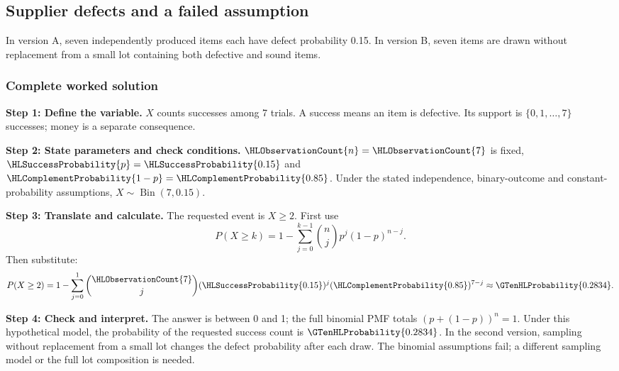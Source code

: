 \clearpage
\subsection{Supplier defects and a failed assumption}\label{prob:defects}
In version A, seven independently produced items each have defect probability 0.15. In version B, seven items are drawn without replacement from a small lot containing both defective and sound items.


\subsubsection*{Complete worked solution}\label{sol:defects}
\par\noindent\begin{minipage}{\linewidth}
\textbf{Step 1: Define the variable.} $X$ counts successes among 7 trials. A success means an item is defective. Its support is $\{0,1,\ldots,7\}$ successes; money is a separate consequence.
\end{minipage}\par\medskip
\par\noindent\begin{minipage}{\linewidth}
\textbf{Step 2: State parameters and check conditions.} $\HLObservationCount{n}=\HLObservationCount{7}$ is fixed, $\HLSuccessProbability{p}=\HLSuccessProbability{0.15}$ and $\HLComplementProbability{1-p}=\HLComplementProbability{0.85}$. Under the stated independence, binary-outcome and constant-probability assumptions, $X\sim\operatorname{Bin}(7,0.15)$.
\end{minipage}\par\medskip
\par\noindent\begin{minipage}{\linewidth}
\textbf{Step 3: Translate and calculate.} The requested event is $ X\geq2$. First use
\[P(X\geq k)=1-\sum_{j=0}^{k-1}\binom nj p^j(1-p)^{n-j}.\]
Then substitute:
\[P(X\geq2)=1-\sum_{j=0}^{1}\binom{\HLObservationCount{7}}j(\HLSuccessProbability{0.15})^j(\HLComplementProbability{0.85})^{7-j}\approx \GTenHLProbability{0.2834}.\]
\end{minipage}\par\medskip
\par\noindent\begin{minipage}{\linewidth}
\textbf{Step 4: Check and interpret.} The answer is between 0 and 1; the full binomial PMF totals $(p+(1-p))^n=1$. Under this hypothetical model, the probability of the requested success count is $\GTenHLProbability{0.2834}$. In the second version, sampling without replacement from a small lot changes the defect probability after each draw. The binomial assumptions fail; a different sampling model or the full lot composition is needed.
\end{minipage}\par\medskip

